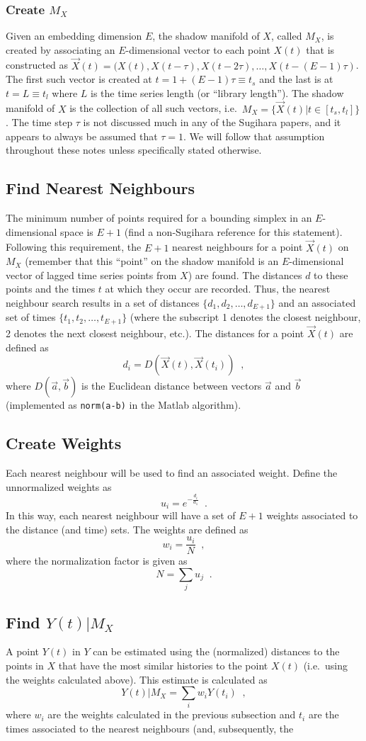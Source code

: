 \documentclass[a4paper,11pt]{article}
\begin{document}
\subsubsection{Create $M_X$}
Given an embedding dimension $E$, the shadow manifold of $X$, called $M_X$, is created by associating an $E$-dimensional vector to each point $X(t)$ that is constructed as $\vec{X}(t)=(X(t),X(t-\tau),X(t-2\tau),\ldots,X(t-(E-1)\tau)$.  The first such vector is created at $t=1+(E-1)\tau\equiv t_s$ and the last is at $t=L\equiv t_l$ where $L$ is the time series length (or ``library length'').  The shadow manifold of $X$ is the collection of all such vectors, i.e.\ $M_X=\{\vec{X}(t) | t\in[t_s,t_l]\}$.  The time step $\tau$ is not discussed much in any of the Sugihara papers, and it appears to always be assumed that $\tau=1$.  We will follow that assumption throughout these notes unless specifically stated otherwise.    \subsection{Find Nearest Neighbours}The minimum number of points required for a bounding simplex in an $E$-dimensional space is $E+1$ (find a non-Sugihara reference for this statement).  Following this requirement, the $E+1$ nearest neighbours for a point $\vec{X}(t)$ on $M_X$ (remember that this ``point'' on the shadow manifold is an $E$-dimensional vector of lagged time series points from $X$) are found. The distances $d$ to these points and the times $t$ at which they occur are recorded.  Thus, the nearest neighbour search results in a set of distances $\{d_1,d_2,\ldots,d_{E+1}\}$ and an associated set of times $\{t_1,t_2,\ldots,t_{E+1}\}$ (where the subscript 1 denotes the closest neighbour, 2 denotes the next closest neighbour, etc.).  The distances for a point $\vec{X}(t)$ are defined as$$d_i = D\left(\vec{X}(t),\vec{X}(t_i)\right)\;\;,$$where $D(\vec{a},\vec{b})$ is the Euclidean distance between vectors $\vec{a}$ and $\vec{b}$ (implemented as {\tt norm(a-b)} in the Matlab algorithm).\subsection{Create Weights}Each nearest neighbour will be used to find an associated weight.  Define the unnormalized weights as$$u_i = e^{-\frac{d_i}{d_1}}\;\;.$$In this way, each nearest neighbour will have a set of $E+1$ weights associated to the distance (and time) sets.  The weights are defined as$$w_i = \frac{u_i}{N}\;\;,$$where the normalization factor is given as$$N = \sum_j u_j\;\;.$$\subsection{Find $Y(t)|M_X$}A point $Y(t)$ in $Y$ can be estimated using the (normalized) distances to the points in $X$ that have the most similar histories to the point $X(t)$ (i.e.\ using the weights calculated above).  This estimate is calculated as$$Y(t)|M_X = \sum_i w_i Y(t_i)\;\;,$$where $w_i$ are the weights calculated in the previous subsection and $t_i$ are the times associated to the nearest neighbours (and, subsequently, the 
\end{document}

